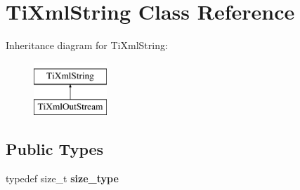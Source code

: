 \hypertarget{classTiXmlString}{\section{Ti\-Xml\-String Class Reference}
\label{classTiXmlString}
}
Inheritance diagram for Ti\-Xml\-String\-:\begin{figure}[H]
\begin{center}
\leavevmode
\includegraphics[height=2.000000cm]{classTiXmlString}
\end{center}
\end{figure}
\subsection*{Public Types}
\begin{DoxyCompactItemize}
\item 
\hypertarget{classTiXmlString_abeb2c1893a04c17904f7c06546d0b971}{typedef size\-\_\-t {\bfseries size\-\_\-type}}\label{classTiXmlString_abeb2c1893a04c17904f7c06546d0b971}

\end{DoxyCompactItemize}
